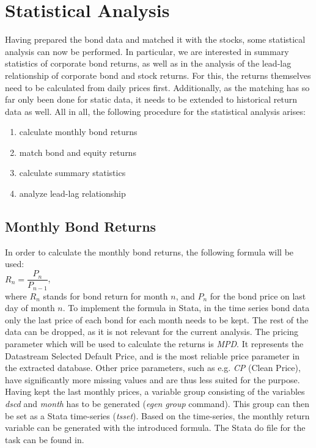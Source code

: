 \chapter{Statistical Analysis} \label{chapter:statistical-analysis}
Having prepared the bond data and matched it with the stocks, some statistical analysis can now be performed. In particular, we are interested in summary statistics of corporate bond returns, as well as in the analysis of the lead-lag relationship of corporate bond and stock returns. For this, the returns themselves need to be calculated from daily prices first. Additionally, as the matching has so far only been done for static data, it needs to be extended to historical return data as well. All in all, the following procedure for the statistical analysis arises: 
\begin{enumerate}
	\item calculate monthly bond returns
	\item match bond and equity returns
	\item calculate summary statistics
	\item analyze lead-lag relationship
\end{enumerate}

\section{Monthly Bond Returns}
In order to calculate the monthly bond returns, the following formula will be used: \\
$R_{n} = \dfrac{P_{n}}{P_{n-1}}$, \\ where $R_{n}$ stands for bond return for month $n$, and $P_{n}$ for the bond price on last day of month $n$. 
To implement the formula in Stata, in the time series bond data only the last price of each bond for each month needs to be kept. The rest of the data can be dropped, as it is not relevant for the current analysis. The pricing parameter which will be used to calculate the returns is \textit{MPD}. It represents the Datastream Selected Default Price, and is the most reliable price parameter in the extracted database. Other price parameters, such as e.g. \textit{CP} (Clean Price), have significantly more missing values and are thus less suited for the purpose. Having kept the last monthly prices, a variable group consisting of the variables \textit{dscd} and \textit{month} has to be generated (\textit{egen} \textit{group} command). This group can then be set as a Stata time-series (\textit{tsset}). Based on the time-series, the monthly return variable can be generated with the introduced formula. The Stata do file for the task can be found in. %

